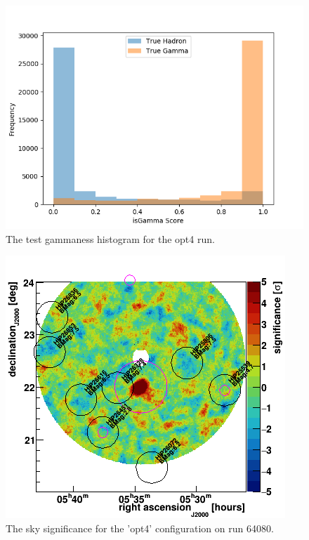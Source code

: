 \begin{figure}[ht] 
        \centering \includegraphics[width=\columnwidth]{figures/crabrun2opt4_hist.png}

        \caption{
                \label{fig:opt4_hist} The test gammaness histogram for the opt4 run.
        }
\end{figure}
\begin{figure}[ht] 
        \centering \includegraphics[width=0.8\columnwidth]{figures/opt4_skysig.png}

        \caption{
                \label{fig:opt4_skysig} The sky significance for the 'opt4' configuration on run 64080.
        }
\end{figure}
